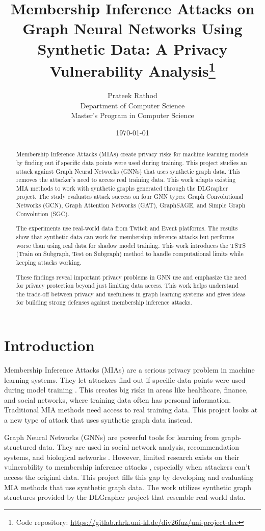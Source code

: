 \documentclass{article}
\title{Membership Inference Attacks on Graph Neural Networks Using Synthetic Data: A Privacy Vulnerability Analysis\footnote{Code repository: \url{https://gitlab.rhrk.uni-kl.de/div26fuz/uni-project-dec}}}
\author{Prateek Rathod\\
Department of Computer Science\\
Master's Program in Computer Science}
\date{\today}
\begin{document}
\maketitle

\begin{abstract}
Membership Inference Attacks (MIAs) create privacy risks for machine learning models by finding out if specific data points were used during training. This project studies an attack against Graph Neural Networks (GNNs) that uses synthetic graph data. This removes the attacker's need to access real training data. This work adapts existing MIA methods to work with synthetic graphs generated through the DLGrapher project\cite{dlgrapher2022}. The study evaluates attack success on four GNN types: Graph Convolutional Networks (GCN), Graph Attention Networks (GAT), GraphSAGE, and Simple Graph Convolution (SGC). 

The experiments use real-world data from Twitch and Event platforms. The results show that synthetic data can work for membership inference attacks but performs worse than using real data for shadow model training. This work introduces the TSTS (Train on Subgraph, Test on Subgraph) method to handle computational limits while keeping attacks working. 

These findings reveal important privacy problems in GNN use and emphasize the need for privacy protection beyond just limiting data access. This work helps understand the trade-off between privacy and usefulness in graph learning systems and gives ideas for building strong defenses against membership inference attacks.
\end{abstract}

\section{Introduction}
Membership Inference Attacks (MIAs) are a serious privacy problem in machine learning systems. They let attackers find out if specific data points were used during model training \cite{shokri2017membership}. This creates big risks in areas like healthcare, finance, and social networks, where training data often has personal information. Traditional MIA methods need access to real training data. This project looks at a new type of attack that uses synthetic graph data instead.

Graph Neural Networks (GNNs) are powerful tools for learning from graph-structured data. They are used in social network analysis, recommendation systems, and biological networks \cite{kipf2017semi, velickovic2018graph, hamilton2017inductive}. However, limited research exists on their vulnerability to membership inference attacks \cite{he2021membership}, especially when attackers can't access the original data. This project fills this gap by developing and evaluating MIA methods that use synthetic graph data. The work utilizes synthetic graph structures provided by the DLGrapher project \cite{dlgrapher2022} that resemble real-world data.
\end{document}

